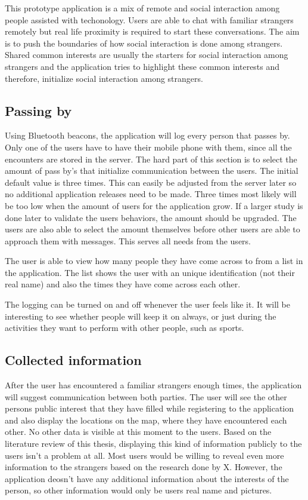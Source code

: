 This prototype application is a mix of remote and social interaction among people assisted with techonology. Users are able to chat with familiar strangers remotely but real life proximity is required to start these conversations. The aim is to push the boundaries of how social interaction is done among strangers. Shared common interests are usually the starters for social interaction among strangers and the application tries to highlight these common interests and therefore, initialize social interaction among strangers.

\subsection{Passing by}

Using Bluetooth beacons, the application will log every person that passes by. Only one of the users have to have their mobile phone with them, since all the encounters are stored in the server. The hard part of this section is to select the amount of pass by's that initialize communication between the users. The initial default value is three times. This can easily be adjusted from the server later so no additional application releases need to be made. Three times most likely will be too low when the amount of users for the application grow. If a larger study is done later to validate the users behaviors, the amount should be upgraded. The users are also able to select the amount themselves before other users are able to approach them with messages. This serves all needs from the users.

The user is able to view how many people they have come across to from a list in the application. The list shows the user with an unique identification (not their real name) and also the times they have come across each other.

The logging can be turned on and off whenever the user feels like it. It will be interesting to see whether people will keep it on always, or just during the activities they want to perform with other people, such as sports.

\subsection{Collected information}

After the user has encountered a familiar strangers enough times, the application will suggest communication between both parties. The user will see the other persons public interest that they have filled while registering to the application and also display the locations on the map, where they have encountered each other. No other data is visible at this moment to the users. Based on the literature review of this thesis, displaying this kind of information publicly to the users isn't a problem at all. Most users would be willing to reveal even more information to the strangers based on the research done by X. However, the application deosn't have any additional information about the  interests of the person, so other information would only be users real name and pictures.

